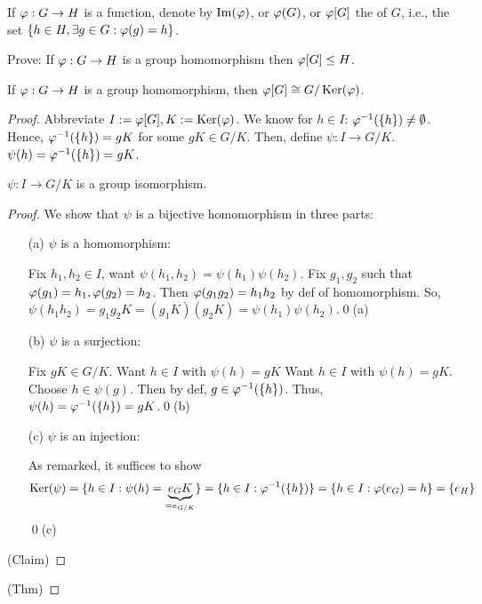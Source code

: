 \documentclass[notes.tex]{subfiles}
\begin{document}

\begin{defn}
	If $\varphi:G\to H$ is a function, denote by $\operatorname{\mathrm{Im}}(\varphi)$, or $\varphi(G)$, or $\varphi[G]$ the  of $G$, i.e., the set $\{h\in H, \exists g\in G: \varphi(g) = h\}$.
\end{defn}

\begin{exercise}
	Prove: If $\varphi:G\to H$ is a group homomorphism then $\varphi[G] \le H$.
\end{exercise}

\begin{theorem}
	\label{FIT}
	If $\varphi:G\to H$ is a group homomorphism, then $\varphi[G]\cong G/\operatorname{\mathrm{Ker}}(\varphi)$.
\end{theorem}

\begin{proof}
	Abbreviate $I:=\varphi[G], K:= \operatorname{\mathrm{Ker}}(\varphi)$.
	We know for $h\in I$: ${\varphi}^{-1}(\{h\}) \ne \emptyset$.
	Hence, ${\varphi}^{-1}(\{h\})=gK$ for some $gK\in G/K$.
	Then, define $\psi:I \to G/K$. $\psi(h) = {\varphi}^{-1}(\{h\})=gK$.

	\begin{claim}
		$\psi:I\to G/K$ is a group isomorphism.
	\end{claim}
	\begin{proof} We show that $\psi$ is a bijective homomorphism in three parts:
		\begin{itemize}
			\item[(a)] $\psi$ is a homomorphism:

			Fix $h_1, h_2\in I$, want $\psi(h_1, h_2) = \psi(h_1)\psi(h_2)$.
			Fix $g_1, g_2$ such that $\varphi(g_1) = h_1, \varphi(g_2) = h_2$.
			Then $\varphi(g_1g_2) = h_1h_2$ by def of homomorphism. So, $\psi(h_1h_2) = g_1g_2K = (g_1K)(g_2K) = \psi(h_1)\psi(h_2)$.\qed(a)
			\item[(b)] $\psi$ is a surjection:

				Fix $gK\in G/K$. Want $h\in I$ with $\psi(h) = gK$
				Want $h\in I$ with $\psi(h) = gK.$ Choose $h\in \psi(g)$.
				Then by def, $g\in {\varphi}^{-1}(\{h\})$. Thus, $\psi(h) = {\varphi}^{-1}(\{h\})=gK$.\qed(b)
			\item[(c)] $\psi$ is an injection:

				As remarked, it suffices to show 
				\[\operatorname{\mathrm{Ker}}(\psi) = \{h\in I : \psi(h) = \underbrace{e_GK}_{=e_{G/K}}\} = \{h\in I : {\varphi}^{-1}(\{h\})\} = \{h\in I : \varphi(e_G) = h\} = \{e_H\}
				\]\qed(c)
		\end{itemize}
		\qedhere(Claim)
	\end{proof}
	\qedhere(Thm)
\end{proof}
\end{document}
